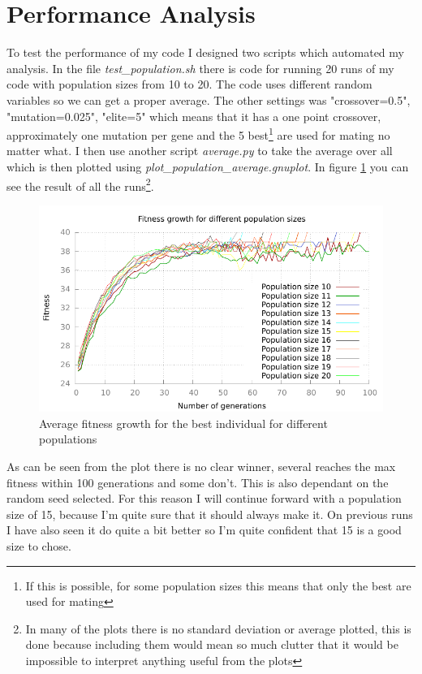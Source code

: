 \section{Performance Analysis}\label{sec:performance analysis}
To test the performance of my code I designed two scripts which automated my
analysis. In the file \textit{test\_population.sh} there is code for running 20
runs of my code with population sizes from 10 to 20. The code uses different
random variables so we can get a proper average. The other settings was
"crossover=0.5", "mutation=0.025", "elite=5" which means that it has a one point
crossover, approximately one mutation per gene and the 5 best\footnote{If this is
possible, for some population sizes this means that only the best are used for
mating} are used for mating no matter what. I then use another script
\textit{average.py} to take the average over all which is then plotted using
\textit{plot\_population\_average.gnuplot}. In figure
\ref{fig:population-average} you can see the result of all the runs\footnote{In
	many of the plots there is no standard deviation or average plotted,
	this is done because including them would mean so much clutter that it
would be impossible to interpret anything useful from the plots}.

\begin{figure}[h!]
	\includegraphics{../graphs/fitness_population_average.pdf}
	\caption{Average fitness growth for the best individual for different populations}
	\label{fig:population-average}
\end{figure}

As can be seen from the plot there is no clear winner, several reaches the max
fitness within 100 generations and some don't. This is also dependant on the
random seed selected. For this reason I will continue forward with a population
size of 15, because I'm quite sure that it should always make it. On previous
runs I have also seen it do quite a bit better so I'm quite confident that 15 is
a good size to chose.

